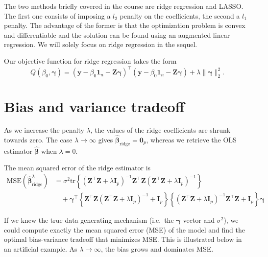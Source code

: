 \documentclass[]{book}
\theoremstyle{definition}
\theoremstyle{definition}
\theoremstyle{definition}
\theoremstyle{remark}
\begin{document}
The two methods briefly covered in the course are ridge regression and LASSO. The first one consists of imposing a \(l_2\) penalty on the coefficients, the second a \(l_1\) penalty. The advantage of the former is that the optimization problem is convex and differentiable and the solution can be found using an augmented linear regression. We will solely focus on ridge regression in the sequel.

Our objective function for ridge regression takes the form
\[Q(\beta_0, \boldsymbol{\gamma}) = (\boldsymbol{y} - \beta_0 \mathbf{1}_n -\mathbf{Z}\boldsymbol{\gamma})^\top(\boldsymbol{y} - \beta_0 \mathbf{1}_n -\mathbf{Z}\boldsymbol{\gamma}) + \lambda \|\boldsymbol{\gamma}\|^2_2. \]

\hypertarget{bias-and-variance-tradeoff}{%
\section{Bias and variance tradeoff}\label{bias-and-variance-tradeoff}}

As we increase the penalty \(\lambda\), the values of the ridge coefficients are shrunk towards zero. The case \(\lambda \to \infty\) gives \(\hat{\boldsymbol{\beta}}_{\mathrm{ridge}}=\boldsymbol{0}_p\), whereas we retrieve the OLS estimator \(\hat{\boldsymbol{\beta}}\) when \(\lambda=0\).

The mean squared error of the ridge estimator is
\begin{align*}
\mathrm{MSE}(\hat{\boldsymbol{\beta}}_{\mathrm{ridge}}^{\lambda}) &= \sigma^2 \mathrm{tr}\left\{(\mathbf{Z}^\top\mathbf{Z} + \lambda \mathbf{I}_p)^{-1}\mathbf{Z}^\top\mathbf{Z}(\mathbf{Z}^\top\mathbf{Z} + \lambda \mathbf{I}_p)^{-1}\right\} \\&\quad + \boldsymbol{\gamma}^\top \left\{ \mathbf{Z}^\top\mathbf{Z}(\mathbf{Z}^\top\mathbf{Z} + \lambda \mathbf{I}_p)^{-1} + \mathbf{I}_p \right\} \left\{ (\mathbf{Z}^\top\mathbf{Z} + \lambda \mathbf{I}_p)^{-1}\mathbf{Z}^\top\mathbf{Z} + \mathbf{I}_p \right\}\boldsymbol{\gamma}
\end{align*}

If we knew the true data generating mechanism (i.e.~the \(\boldsymbol{\gamma}\) vector and \(\sigma^2\)), we could compute exactly the mean squared error (MSE) of the model and find the optimal bias-variance tradeoff that minimizes MSE. This is illustrated below in an artificial example. As \(\lambda \to \infty\), the bias grows and dominates MSE.
\end{document}
